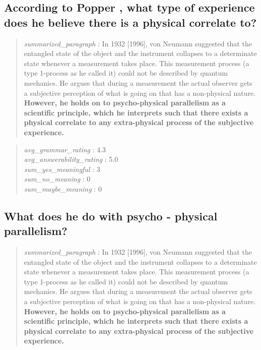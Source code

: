 \hypertarget{according-to-popper-what-type-of-experience-does-he-believe-there-is-a-physical-correlate-to}{%
\subsection{According to Popper , what type of experience does he
believe there is a physical correlate
to?}\label{according-to-popper-what-type-of-experience-does-he-believe-there-is-a-physical-correlate-to}}

\begin{quote}
\emph{summarized\_paragraph} : In 1932 {[}1996{]}, von Neumann suggested
that the entangled state of the object and the instrument collapses to a
determinate state whenever a measurement takes place. This measurement
process (a type 1-process as he called it) could not be described by
quantum mechanics. He argues that during a measurement the actual
observer gets a subjective perception of what is going on that has a
non-physical nature. \textbf{However, he holds on to psycho-physical
parallelism as a scientific principle, which he interprets such that
there exists a physical correlate to any extra-physical process of the
subjective experience.}
\end{quote}

\begin{quote}
\emph{avg\_grammar\_rating} : 4.3\\
\emph{avg\_answerability\_rating} : 5.0\\
\emph{sum\_yes\_meaningful} : 3\\
\emph{sum\_no\_meaning} : 0\\
\emph{sum\_maybe\_meaning} : 0
\end{quote}

\hypertarget{what-does-he-do-with-psycho---physical-parallelism}{%
\subsection{What does he do with psycho - physical
parallelism?}\label{what-does-he-do-with-psycho---physical-parallelism}}

\begin{quote}
\emph{summarized\_paragraph} : In 1932 {[}1996{]}, von Neumann suggested
that the entangled state of the object and the instrument collapses to a
determinate state whenever a measurement takes place. This measurement
process (a type 1-process as he called it) could not be described by
quantum mechanics. He argues that during a measurement the actual
observer gets a subjective perception of what is going on that has a
non-physical nature. \textbf{However, he holds on to psycho-physical
parallelism as a scientific principle, which he interprets such that
there exists a physical correlate to any extra-physical process of the
subjective experience.}
\end{quote}

